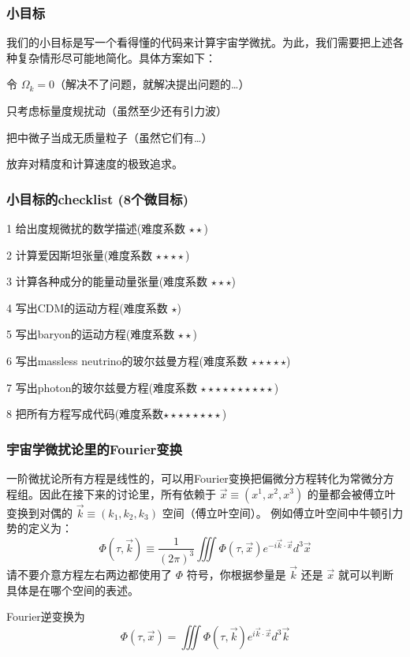 \documentclass[CJK,13pt]{beamer}
\begin{document}
  \begin{frame}
    \frametitle{小目标}
    我们的小目标是写一个看得懂的代码来计算宇宙学微扰。为此，我们需要把上述各种复杂情形尽可能地简化。具体方案如下：

    
    \bitem
  \item{令 $\Omega_k=0$（解决不了问题，就解决提出问题的…）}
  \item{只考虑标量度规扰动（虽然至少还有引力波）}    
  \item{把中微子当成无质量粒子（虽然它们有…）}    
  \item{放弃对精度和计算速度的极致追求。}
    \eitem

    
  \end{frame}


  
  \begin{frame}
    \frametitle{小目标的checklist (8个微目标)}
    \bitem
  \item[1]{给出度规微扰的数学描述(难度系数 $\star\star$)}
  \item[2]{计算爱因斯坦张量(难度系数 $\star\star\star\star$)}
  \item[3]{计算各种成分的能量动量张量(难度系数 $\star\star\star$)}    
  \item[4]{写出CDM的运动方程(难度系数 $\star$)}
  \item[5]{写出baryon的运动方程(难度系数 $\star\star$)}        
  \item[6]{写出massless neutrino的玻尔兹曼方程(难度系数 $\star\star\star\star\star$)}
  \item[7]{写出photon的玻尔兹曼方程(难度系数 $\star\star\star\star\star\star\star\star\star\star$)}
  \item[8]{把所有方程写成代码(难度系数$\star\star\star\star\star\star\star\star$)}
    \eitem
  \end{frame}


 \begin{frame}
   \frametitle{宇宙学微扰论里的Fourier变换}
    一阶微扰论所有方程是线性的，可以用Fourier变换把偏微分方程转化为常微分方程组。因此在接下来的讨论里，所有依赖于 $\vec{x} \equiv (x^1,x^2,x^3)$ 的量都会被傅立叶变换到对偶的 $\vec{k}\equiv (k_1, k_2, k_3)$ 空间（傅立叶空间）。
    例如傅立叶空间中牛顿引力势的定义为：
    $$\Phi(\tau, \vec{k})\equiv \frac{1}{(2\pi)^3}\iiint \Phi(\tau, \vec{x}) e^{-i\vec{k}\cdot\vec{x}}d^3\vec{x}$$
    请不要介意方程左右两边都使用了 $\Phi$ 符号，你根据参量是 $\vec{k}$ 还是 $\vec{x}$ 就可以判断具体是在哪个空间的表述。

    \skipline

    Fourier逆变换为
    $$\Phi(\tau, \vec{x}) = \iiint \Phi(\tau, \vec{k}) e^{i\vec{k}\cdot\vec{x}}d^3\vec{k}$$
  \end{frame}
\end{document}
